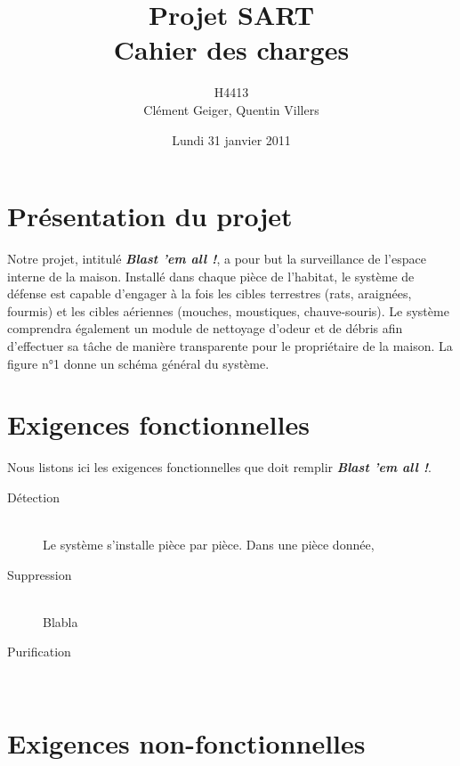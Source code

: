 \documentclass[12pt]{article}
\title{\textbf{Projet SART}\\Cahier des charges}
\author{H4413\\Clément Geiger, Quentin Villers}
\date{Lundi 31 janvier 2011}
\begin{document}
\maketitle

\thispagestyle{empty}

\vfill
\pagebreak

\section{Présentation du projet}

Notre projet, intitulé \textit{\textbf{Blast 'em all !}}, a pour but la
surveillance de l'espace interne de la maison. Installé dans chaque pièce
de l'habitat, le système de défense est capable d'engager à la fois les
cibles terrestres (rats, araignées, fourmis) et les cibles aériennes
(mouches, moustiques, chauve-souris). Le système comprendra également un
module de nettoyage d'odeur et de débris afin d'effectuer sa tâche de
manière transparente pour le propriétaire de la maison. La figure n°1
donne un schéma général du système.


\section{Exigences fonctionnelles}

Nous listons ici les exigences fonctionnelles que doit remplir 
\textit{\textbf{Blast 'em all !}}.
\begin{description}
\item[Détection]\hfill\\
Le système s'installe pièce par pièce. Dans une pièce donnée, 
\item[Suppression]\hfill\\
Blabla
\item[Purification]\hfill\\
\end{description}

\section{Exigences non-fonctionnelles}
\end{document}
